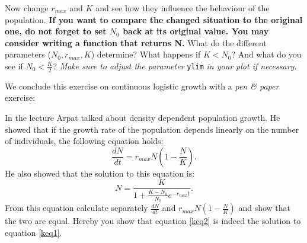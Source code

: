 \documentclass{article}\usepackage[]{graphicx}\usepackage[]{color}
\begin{document}
Now change $r_{max}$ and $K$ and see how they influence the behaviour of the population. \textbf{If you want to compare the changed situation to the original one, do not forget to set $N_0$ back at its original value. You may consider writing a function that returns N.} What do the different parameters ($N_0,r_{max}, K$) determine? What happens if $K<N_0$? And what do you see if $N_0 < \frac{K}{2}$? \textit{Make sure to adjust the parameter} \texttt{ylim} \textit{in your plot if necessary.}

We conclude this exercise on continuous logistic growth with a \textit{pen \& paper} exercise:
\begin{Exercise}[title=Logistic Growth,label=kloge1,difficulty=2]
\noindent In the lecture Arpat talked about density dependent population growth. He showed that if the growth rate of the population depends linearly on the number of individuals, the following equation holds:
\begin{equation}
\frac{dN}{dt} = r_{max} N \left( 1-\frac{N}{K}\right).
\label{keq1}
\end{equation}
He also showed that the solution to this equation is:
\begin{equation}
N = \frac{K}{1+\frac{K-N_0}{N_0}e^{-r_{max}t}}.
\label{keq2}
\end{equation}
From this equation calculate separately $\frac{dN}{dt}$ and  $r_{max} N \left( 1-\frac{N}{K}\right) $ and show that the two are equal. Hereby you show that equation \ref{keq2} is indeed the solution to equation \ref{keq1}.

\end{Exercise}
\end{document}
